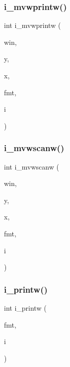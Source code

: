 \subsubsection{\texorpdfstring{i\+\_\+mvwprintw()}{i\_mvwprintw()}}
{\footnotesize\ttfamily int i\+\_\+mvwprintw (\begin{DoxyParamCaption}\item[{W\+I\+N\+D\+OW $\ast$}]{win,  }\item[{int}]{y,  }\item[{int}]{x,  }\item[{const char $\ast$}]{fmt,  }\item[{int}]{i }\end{DoxyParamCaption})}

\mbox{\label{C-macros_8c_ac0518e313ddc0b8e826cfb049c36e257}} 
\subsubsection{\texorpdfstring{i\+\_\+mvwscanw()}{i\_mvwscanw()}}
{\footnotesize\ttfamily int i\+\_\+mvwscanw (\begin{DoxyParamCaption}\item[{W\+I\+N\+D\+OW $\ast$}]{win,  }\item[{int}]{y,  }\item[{int}]{x,  }\item[{char $\ast$}]{fmt,  }\item[{int $\ast$}]{i }\end{DoxyParamCaption})}

\mbox{\label{C-macros_8c_a49f96e50b927c6cc42f2f7b3c4e25a2a}} 
\subsubsection{\texorpdfstring{i\+\_\+printw()}{i\_printw()}}
{\footnotesize\ttfamily int i\+\_\+printw (\begin{DoxyParamCaption}\item[{const char $\ast$}]{fmt,  }\item[{int}]{i }\end{DoxyParamCaption})}


